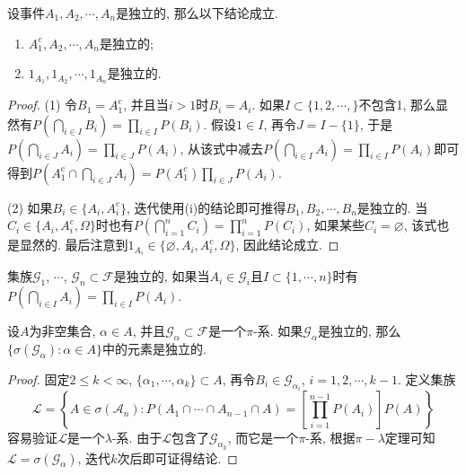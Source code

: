 \documentclass[cn, 12pt, math=mtpro2, bibstyle=apa, blue, twocol]{elegantbook}
\newcommand{\F}{\mathcal{F}}
\let\emptyset\varnothing
\begin{document}
\begin{theorem}\label{thm:thm2.13}
  设事件$A_1,A_2,\cdots,A_n$是独立的, 那么以下结论成立.
  \begin{enumerate}[label=(\arabic*)]
    \item $A_1^c,A_2,\cdots,A_n$是独立的;
    \item $1_{A_1},1_{A_2},\cdots,1_{A_n}$是独立的.
  \end{enumerate}
\end{theorem}
\begin{proof}
  (1) 令$B_1=A_1^c$, 并且当$i>1$时$B_i=A_i$. 如果$I\subset \{1,2,\cdots,\}$不包含1, 那么显然有$P(\bigcap_{i\in I}B_i)=\prod_{i\in I}P(B_i)$. 假设$1\in I$, 再令$J=I-\{1\}$, 于是$P(\bigcap_{i \in J}A_i)=\prod_{i\in J}P(A_i)$, 从该式中减去$P(\bigcap_{i\in I}A_i)=\prod_{i\in I}P(A_i)$即可得到$P(A_1^c\cap\bigcap_{i\in J}A_i)=P(A_1^c)\prod_{i\in J}P(A_i)$.

  (2) 如果$B_i\in\{A_i,A_i^c\}$, 迭代使用(i)的结论即可推得$B_1,B_2,\cdots,B_n$是独立的. 当$C_i\in\{A_i,A_i^c,\Omega\}$时也有$P(\bigcap_{i=1}^nC_i)=\prod_{i=1}^nP(C_i)$, 如果某些$C_i=\emptyset$, 该式也是显然的. 最后注意到$1_{A_i}\in \{\emptyset,A_i,A_i^c,\Omega\}$, 因此结论成立.
\end{proof}


\begin{definition}
集族$\mathcal{G}_1$,  $\cdots$, $\mathcal{G}_n\subset \F$是独立的, 如果当$A_i\in\mathcal{G}_i$且$I\subset \{1,\cdots,n\}$时有$P(\bigcap_{i\in I}A_i)=\prod_{i\in I}P(A_i)$.
\end{definition}

\begin{theorem}\label{thm:thm2.2}
  设$A$为非空集合, $\alpha\in A$, 并且$\mathcal{G}_\alpha \subset \F$是一个$\pi$-系. 如果$\mathcal{G}_\alpha$是独立的, 那么$\{\sigma(\mathcal{G}_\alpha):\alpha\in A\}$中的元素是独立的.
\end{theorem}
\begin{proof}
  固定$2\leq k<\infty$, $\{\alpha_1,\cdots,\alpha_k\}\subset A$, 再令$B_i\in\mathcal{G}_{\alpha_i}$, $i=1,2,\cdots,k-1$. 定义集族
  $$\mathcal{L}=\left\{A\in\sigma(\mathcal{A}_n): P(A_1\cap\cdots\cap A_{n-1}\cap A)=\left[\prod_{i=1}^{n-1}P(A_i)\right]P(A)\right\}$$
  容易验证$\mathcal{L}$是一个$\lambda$-系. 由于$\mathcal{L}$包含了$\mathcal{G}_{\alpha_k}$, 而它是一个$\pi$-系, 根据$\pi-\lambda$定理可知$\mathcal{L}=\sigma(\mathcal{G}_\alpha)$, 迭代$k$次后即可证得结论.
\end{proof}
\end{document}
